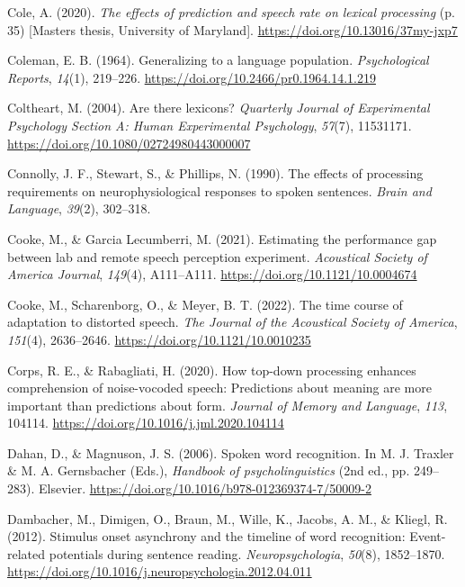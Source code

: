 \documentclass[a4paper, nobind]{templates/ociamthesis}
\newlength{\cslhangindent}
\newenvironment{CSLReferences}[2] %
 {%
  \setlength{\parindent}{0pt}
  \ifodd #1
  \let\oldpar\par
  \def\par{\hangindent=\cslhangindent\oldpar}
  \fi
  \setlength{\parskip}{1mm}
  \setlength{\baselineskip}{6mm}
 }%
 {}
\begin{document}
\begin{CSLReferences}{1}{0}
\leavevmode{}%
Cole, A. (2020). \emph{{The effects of prediction and speech rate on lexical processing}} (p. 35) {[}Masters thesis, University of Maryland{]}. \url{https://doi.org/10.13016/37my-jxp7}

\leavevmode{}%
Coleman, E. B. (1964). {Generalizing to a language population}. \emph{Psychological Reports}, \emph{14}(1), 219--226. \url{https://doi.org/10.2466/pr0.1964.14.1.219}

\leavevmode{}%
Coltheart, M. (2004). Are there lexicons? \emph{Quarterly Journal of Experimental Psychology Section A: Human Experimental Psychology}, \emph{57}(7), 11531171. \url{https://doi.org/10.1080/02724980443000007}

\leavevmode{}%
Connolly, J. F., Stewart, S., \& Phillips, N. (1990). The effects of processing requirements on neurophysiological responses to spoken sentences. \emph{Brain and Language}, \emph{39}(2), 302--318.

\leavevmode{}%
Cooke, M., \& Garcia Lecumberri, M. (2021). Estimating the performance gap between lab and remote speech perception experiment. \emph{Acoustical Society of America Journal}, \emph{149}(4), A111--A111. \url{https://doi.org/10.1121/10.0004674}

\leavevmode{}%
Cooke, M., Scharenborg, O., \& Meyer, B. T. (2022). The time course of adaptation to distorted speech. \emph{The Journal of the Acoustical Society of America}, \emph{151}(4), 2636--2646. \url{https://doi.org/10.1121/10.0010235}

\leavevmode{}%
Corps, R. E., \& Rabagliati, H. (2020). How top-down processing enhances comprehension of noise-vocoded speech: Predictions about meaning are more important than predictions about form. \emph{Journal of Memory and Language}, \emph{113}, 104114. \url{https://doi.org/10.1016/j.jml.2020.104114}

\leavevmode{}%
Dahan, D., \& Magnuson, J. S. (2006). Spoken word recognition. In M. J. Traxler \& M. A. Gernsbacher (Eds.), \emph{Handbook of psycholinguistics} (2nd ed., pp. 249--283). Elsevier. \url{https://doi.org/10.1016/b978-012369374-7/50009-2}

\leavevmode{}%
Dambacher, M., Dimigen, O., Braun, M., Wille, K., Jacobs, A. M., \& Kliegl, R. (2012). {Stimulus onset asynchrony and the timeline of word recognition: Event-related potentials during sentence reading}. \emph{Neuropsychologia}, \emph{50}(8), 1852--1870. \url{https://doi.org/10.1016/j.neuropsychologia.2012.04.011}


\end{CSLReferences}
\end{document}
